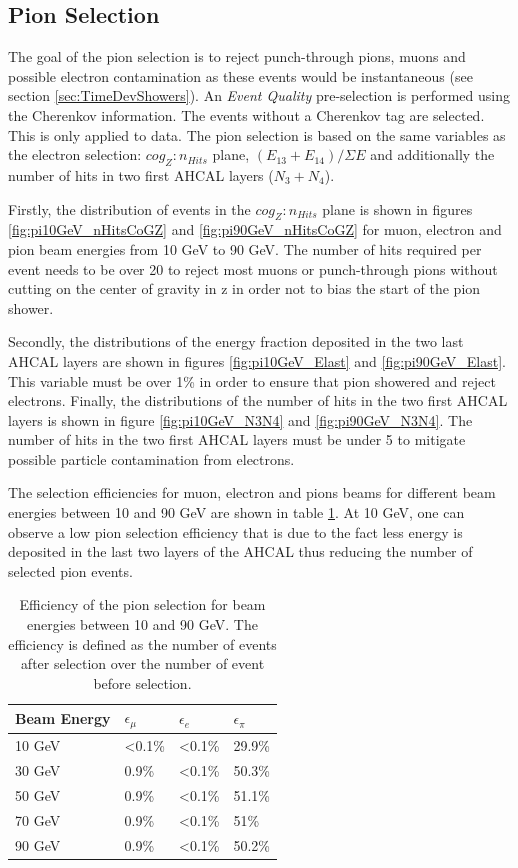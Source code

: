 \subsection{Pion Selection}
\label{sec:pionsel}

The goal of the pion selection is to reject punch-through pions, muons and possible electron contamination as these events would be instantaneous (see section \ref{sec:TimeDevShowers}). An \textit{Event Quality} pre-selection is performed using the Cherenkov information. The events without a Cherenkov tag are selected. This is only applied to data. The pion selection is based on the same variables as the electron selection: $cog_Z:n_{Hits}$ plane, $(E_{13}+E_{14})/\Sigma E$ and additionally the number of hits in two first AHCAL layers ($N_3+N_4$).

Firstly, the distribution of events in the $cog_Z:n_{Hits}$ plane is shown in figures \ref{fig:pi10GeV_nHitsCoGZ} and \ref{fig:pi90GeV_nHitsCoGZ} for muon, electron and pion beam energies from 10 GeV to 90 GeV. The number of hits required per event needs to be over 20 to reject most muons or punch-through pions without cutting on the center of gravity in z in order not to bias the start of the pion shower.

Secondly, the distributions of the energy fraction deposited in the two last AHCAL layers are shown in figures \ref{fig:pi10GeV_Elast} and \ref{fig:pi90GeV_Elast}. This variable must be over 1\% in order to ensure that pion showered and reject electrons. Finally, the distributions of the number of hits in the two first AHCAL layers is shown in figure \ref{fig:pi10GeV_N3N4} and \ref{fig:pi90GeV_N3N4}. The number of hits in the two first AHCAL layers must be under 5 to mitigate possible particle contamination from electrons.

The selection efficiencies for muon, electron and pions beams for different beam energies between 10 and 90 GeV are shown in table \ref{table:eff_pion}. At 10 GeV, one can observe a low pion selection efficiency that is due to the fact less energy is deposited in the last two layers of the AHCAL thus reducing the number of selected pion events.

\begin{table}[htb!]
	\centering
	\caption{Efficiency of the pion selection for beam energies between 10 and 90 GeV. The efficiency is defined as the number of events after selection over the number of event before selection.}
	\label{table:eff_pion}
	\begin{tabular}{@{} llll @{}}
		\toprule
		\textbf{Beam Energy} & \textbf{$\epsilon_{\mu}$} & \textbf{$\epsilon_{e}$} & \textbf{$\epsilon_{\pi}$}\\
		\midrule
		10 GeV & <0.1\% & <0.1\% & 29.9\%\\
		30 GeV & 0.9\% & <0.1\% & 50.3\%\\
		50 GeV & 0.9\% & <0.1\% & 51.1\%\\
		70 GeV & 0.9\% & <0.1\% & 51\%\\
		90 GeV & 0.9\% & <0.1\% & 50.2\%\\
		\bottomrule
	\end{tabular}
\end{table}

